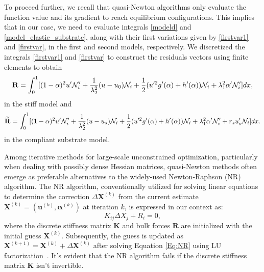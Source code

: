 To proceed further, we recall that quasi-Newton algorithms only evaluate the function value and its gradient to reach equilibrium configurations. This implies that in our case, we need to evaluate integrals \eqref{modeld} and \eqref{model_elastic_substrate}, along with their first variations given by \eqref{firstvar1} and \eqref{firstvar}, in the first and second models, respectively. We   discretized the integrals \eqref{firstvar1} and \eqref{firstvar} to construct the residuals vectors using finite elements to obtain 
\begin{equation}
    {\bf R} =
     \int_0^1 [(1-\alpha)^2u'\mathcal{N}'_i+\frac{1}{\lambda_2^2} (u-u_0) \mathcal{N}_i+\frac{1}{2}(u'^2 g'(\alpha)+h'(\alpha))\mathcal{N}_i+\lambda_1^2\alpha'\mathcal{N}'_i ]dx,\label{residual1}
\end{equation}
in the stiff model and 
\begin{equation}
    \widetilde{{\bf R}}= 
    \int_0^1 [(1-\alpha)^2u'\mathcal{N}'_i+\frac{1}{\lambda_2^2} (u-u_s) \mathcal{N}_i+\frac{1}{2}(u'^2 g'(\alpha)+h'(\alpha))\mathcal{N}_i+\lambda_1^2\alpha'\mathcal{N}'_i +r_su_s'\mathcal{N}_i]dx\label{residual2}.
\end{equation}
in the compliant substrate model. 

Among iterative methods for large-scale unconstrained optimization, particularly when dealing with possibly dense Hessian matrices,  quasi-Newton methods often emerge as preferable alternatives to the widely-used Newton-Raphson (NR) algorithm. The NR algorithm, conventionally utilized for solving linear equations to determine the correction $\Delta \mathbf{X}^{(k)}$ from the current estimate $\mathbf{X}^{(k)} = (\mathbf{u}^{(k)}, \boldsymbol{\alpha}^{(k)})$ at iteration $k$, is expressed in our context as:
\begin{equation}
K_{ij} \Delta X_j + R_i = 0,
\label{Eq:NR}
\end{equation}
where the discrete stiffness matrix $\mathbf{K}$ and bulk forces $\mathbf{R}$ are initialized with the initial guess $\mathbf{X}^{(k)}$. Subsequently, the guess is updated as $\mathbf{X}^{(k+1)} = \mathbf{X}^{(k)} + \Delta \mathbf{X}^{(k)}$ after solving Equation \eqref{Eq:NR} using LU factorization~\cite{Sanderson2016-ht}. It's evident that the NR algorithm fails if the discrete stiffness matrix $\mathbf{K}$ isn't invertible.

